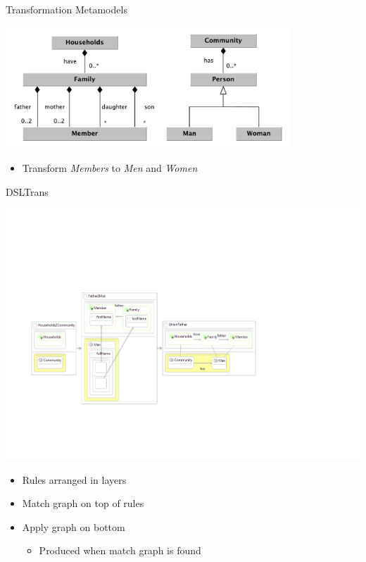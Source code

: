 \documentclass[xcolor=dvipsnames, 12pt, handout]{beamer}
\begin{document}
\begin{frame}{Transformation Metamodels}

\begin{center}
\includegraphics[width=0.8\textwidth]{figures/Metamodels_F2P}
\end{center}
\begin{itemize}
\item Transform \textit{Members} to \textit{Men} and \textit{Women}
\end{itemize}
\end{frame}


\begin{frame}{DSLTrans}
\begin{center}
\includegraphics[width=\textwidth]{figures/Rules}
\end{center}
\pause
\begin{itemize}[<+->]
\item Rules arranged in layers
\item Match graph on top of rules
\item Apply graph on bottom
\begin{itemize}
\item Produced when match graph is found
\end{itemize}
\end{itemize}
\end{frame}
\end{document}
